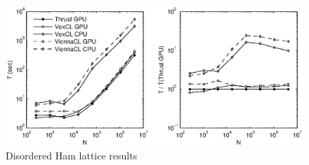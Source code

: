 \documentclass[1p]{elsarticle}
\begin{document}
\begin{figure}
    \begin{center}
	\includegraphics[width=\textwidth]{data/disordered_ham_lattice/perfcmp}
    \end{center}
    \caption{Disordered Ham lattice results}
    \label{fig:lattice:perf}
\end{figure}
\end{document}
